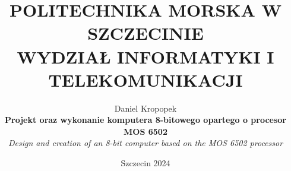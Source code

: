 \documentclass[11pt]{report}
\begin{document}

\title{\textbf{POLITECHNIKA MORSKA W SZCZECINIE\\
WYDZIAŁ INFORMATYKI I TELEKOMUNIKACJI}}
\author{\Large{Daniel Kropopek \\[1cm] 
\textbf{Projekt oraz wykonanie komputera 8-bitowego opartego o procesor MOS 6502} \\[0.5cm]
\textit{Design and creation of an 8-bit computer based on the MOS 6502 processor}}}

\date{Szczecin 2024}

\maketitle



\tableofcontents


\begingroup
\let\clearpage\relax

\endgroup

\listoftables
\printbibliography
\end{document}
